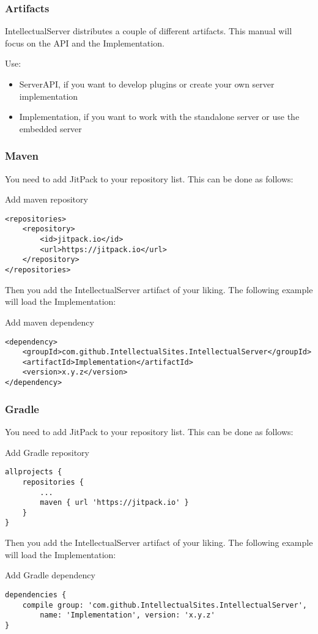 \documentclass[12pt]{article}
\begin{document}
\subsubsection{Artifacts}
IntellectualServer distributes a couple of different artifacts. This manual will focus on the API and the Implementation. 

Use:
\begin{itemize}
	\item ServerAPI, if you want to develop plugins or create your own server implementation
	\item Implementation, if you want to work with the standalone server or use the embedded server
\end{itemize}



\subsubsection{Maven}
You need to add JitPack to your repository list. This can be done as follows:
\begin{listing}[H]
\caption{Add maven repository}
\begin{verbatim}
<repositories>
    <repository>
        <id>jitpack.io</id>
        <url>https://jitpack.io</url>
    </repository>
</repositories>
\end{verbatim}
\end{listing}

Then you add the IntellectualServer artifact of your liking. The following example will load the Implementation:
\begin{listing}[H]
\caption{Add maven dependency}
\begin{verbatim}
<dependency>
    <groupId>com.github.IntellectualSites.IntellectualServer</groupId>
    <artifactId>Implementation</artifactId>
    <version>x.y.z</version>
</dependency>
\end{verbatim}
\end{listing}

\subsubsection{Gradle}
You need to add JitPack to your repository list. This can be done as follows:
\begin{listing}[H]
\caption{Add Gradle repository}
\begin{verbatim}
allprojects {
	repositories {
		...
		maven { url 'https://jitpack.io' }
	}
}
\end{verbatim}
\end{listing}

Then you add the IntellectualServer artifact of your liking. The following example will load the Implementation:
\begin{listing}[H]
\caption{Add Gradle dependency}
\begin{verbatim}
dependencies {
	compile group: 'com.github.IntellectualSites.IntellectualServer',
		name: 'Implementation', version: 'x.y.z'
}
\end{verbatim}
\end{listing}

\newpage
\listoflistings
\end{document}
